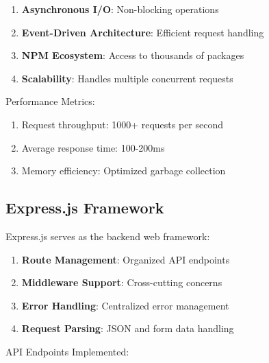 \documentclass[12pt,a4paper]{report}
\begin{document}
\begin{enumerate}[label=\roman*)]
    \item \textbf{Asynchronous I/O}: Non-blocking operations
    \item \textbf{Event-Driven Architecture}: Efficient request handling
    \item \textbf{NPM Ecosystem}: Access to thousands of packages
    \item \textbf{Scalability}: Handles multiple concurrent requests
\end{enumerate}

Performance Metrics:
\begin{enumerate}[label=\roman*)]
    \item Request throughput: 1000+ requests per second
    \item Average response time: 100-200ms
    \item Memory efficiency: Optimized garbage collection
\end{enumerate}

\subsection{Express.js Framework}

Express.js serves as the backend web framework:

\begin{enumerate}[label=\roman*)]
    \item \textbf{Route Management}: Organized API endpoints
    \item \textbf{Middleware Support}: Cross-cutting concerns
    \item \textbf{Error Handling}: Centralized error management
    \item \textbf{Request Parsing}: JSON and form data handling
\end{enumerate}

API Endpoints Implemented:
\end{document}
